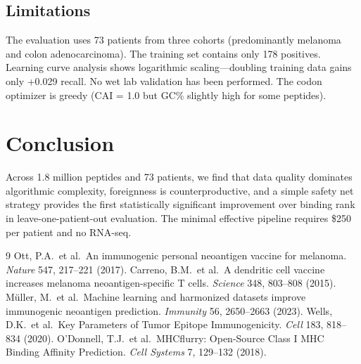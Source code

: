 \documentclass[11pt,twocolumn]{article}
\begin{document}
\subsection{Limitations}

The evaluation uses 73 patients from three cohorts (predominantly melanoma and colon adenocarcinoma). The training set contains only 178 positives. Learning curve analysis shows logarithmic scaling---doubling training data gains only +0.029 recall. No wet lab validation has been performed. The codon optimizer is greedy (CAI = 1.0 but GC\% slightly high for some peptides).

\section{Conclusion}

Across 1.8 million peptides and 73 patients, we find that data quality dominates algorithmic complexity, foreignness is counterproductive, and a simple safety net strategy provides the first statistically significant improvement over binding rank in leave-one-patient-out evaluation. The minimal effective pipeline requires \$250 per patient and no RNA-seq.

\begin{thebibliography}{9}
 Ott, P.A.\ et al.\ An immunogenic personal neoantigen vaccine for melanoma. \textit{Nature} 547, 217--221 (2017).
 Carreno, B.M.\ et al.\ A dendritic cell vaccine increases melanoma neoantigen-specific T cells. \textit{Science} 348, 803--808 (2015).
 M\"{u}ller, M.\ et al.\ Machine learning and harmonized datasets improve immunogenic neoantigen prediction. \textit{Immunity} 56, 2650--2663 (2023).
 Wells, D.K.\ et al.\ Key Parameters of Tumor Epitope Immunogenicity. \textit{Cell} 183, 818--834 (2020).
 O'Donnell, T.J.\ et al.\ MHCflurry: Open-Source Class I MHC Binding Affinity Prediction. \textit{Cell Systems} 7, 129--132 (2018).
\end{thebibliography}
\end{document}
